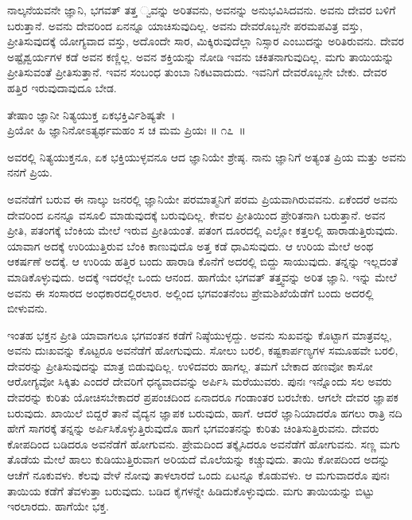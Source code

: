 ನಾಲ್ಕನೆಯವನೇ ಜ್ಞಾನಿ, ಭಗವತ್ ತತ್ತ ್ವವನ್ನು ಅರಿತವನು, ಅವನನ್ನು ಅನುಭವಿಸಿದವನು. ಅವನು ದೇವರ ಬಳಿಗೆ ಬರುತ್ತಾನೆ. ಅವನು ದೇವರಿಂದ ಏನನ್ನೂ ಯಾಚಿಸುವುದಿಲ್ಲ. ಅವನು ದೇವರೊಬ್ಬನೇ ಪರಮಪವಿತ್ರ ವಸ್ತು, ಪ್ರೀತಿಸುವುದಕ್ಕೆ ಯೋಗ್ಯವಾದ ವಸ್ತು, ಅದೊಂದೇ ಸಾರ, ಮಿಕ್ಕಿರುವುದೆಲ್ಲಾ ನಿಸ್ಸಾರ ಎಂಬುದನ್ನು ಅರಿತಿರುವನು. ದೇವರ ಅಷ್ಟೈಶ್ವರ್ಯಗಳ ಕಡೆ ಅವನ ಕಣ್ಣಿಲ್ಲ. ಅವನ ಶಕ್ತಿಯನ್ನು ನೋಡಿ ಇವನು ಚಕಿತನಾಗುವುದಿಲ್ಲ. ಮಗು ತಾಯಿಯನ್ನು ಪ್ರೀತಿಸುವಂತೆ ಪ್ರೀತಿಸುತ್ತಾನೆ. ಇವನ ಸಂಬಂಧ ತುಂಬಾ ನಿಕಟವಾದುದು. ಇವನಿಗೆ ದೇವರೊಬ್ಬನೇ ಬೇಕು. ದೇವರ ಹತ್ತಿರ ಇರುವುದಾವುದೂ ಬೇಡ.

\begin{shloka}
ತೇಷಾಂ ಜ್ಞಾನೀ ನಿತ್ಯಯುಕ್ತ ಏಕಭಕ್ತಿರ್ವಿಶಿಷ್ಯತೇ~।\\ಪ್ರಿಯೋ ಹಿ ಜ್ಞಾನಿನೋಽತ್ಯರ್ಥಮಹಂ ಸ ಚ ಮಮ ಪ್ರಿಯಃ \hfill॥ ೧೭~॥
\end{shloka}

\begin{artha}
ಅವರಲ್ಲಿ ನಿತ್ಯಯುಕ್ತನೂ, ಏಕ ಭಕ್ತಿಯುಳ್ಳವನೂ ಆದ ಜ್ಞಾನಿಯೇ ಶ್ರೇಷ್ಠ. ನಾನು ಜ್ಞಾನಿಗೆ ಅತ್ಯಂತ ಪ್ರಿಯ ಮತ್ತು ಅವನು ನನಗೆ ಪ್ರಿಯ.
\end{artha}

ಅವನೆಡೆಗೆ ಬರುವ ಈ ನಾಲ್ಕು ಜನರಲ್ಲಿ ಜ್ಞಾನಿಯೇ ಪರಮಾತ್ಮನಿಗೆ ಪರಮ ಪ್ರಿಯವಾಗಿರು\-ವವನು. ಏಕೆಂದರೆ ಅವನು ದೇವರಿಂದ ಏನನ್ನೂ ವಸೂಲಿ ಮಾಡುವುದಕ್ಕೆ ಬರುವುದಿಲ್ಲ. ಕೇವಲ ಪ್ರೀತಿಯಿಂದ ಪ್ರೇರಿತನಾಗಿ ಬರುತ್ತಾನೆ. ಅವನ ಪ್ರೀತಿ, ಪತಂಗಕ್ಕೆ ಬೆಂಕಿಯ ಮೇಲೆ ಇರುವ ಪ್ರೀತಿಯಂತೆ. ಪತಂಗ ದೂರದಲ್ಲಿ ಎಲ್ಲೋ ಕತ್ತಲಲ್ಲಿ ಹಾರಾಡುತ್ತಿರುವುದು. ಯಾವಾಗ ಅದಕ್ಕೆ ಉರಿಯುತ್ತಿರುವ ಬೆಂಕಿ ಕಾಣುವುದೊ ಅತ್ತ ಕಡೆ ಧಾವಿಸುವುದು. ಆ ಉರಿಯ ಮೇಲೆ ಅಂಥ ಆಕರ್ಷಣೆ ಅದಕ್ಕೆ. ಆ ಉರಿಯ ಹತ್ತಿರ ಬಂದು ಹಾರಾಡಿ ಕೊನೆಗೆ ಅದರಲ್ಲಿ ಬಿದ್ದು ಸಾಯುವುದು. ತನ್ನನ್ನು ಇಲ್ಲದಂತೆ ಮಾಡಿಕೊಳ್ಳುವುದು. ಅದಕ್ಕೆ ಇದರಲ್ಲೇ ಒಂದು ಆನಂದ. ಹಾಗೆಯೇ ಭಗವತ್ ತತ್ತ್ವವನ್ನು ಅರಿತ ಜ್ಞಾನಿ. ಇನ್ನು ಮೇಲೆ ಅವನು ಈ ಸಂಸಾರದ ಅಂಧಕಾರದಲ್ಲಿರಲಾರ. ಅಲ್ಲಿಂದ ಭಗವಂತನೆಂಬ ಪ್ರೇಮಶಿಖೆಯೆಡೆಗೆ ಬಂದು ಅದರಲ್ಲಿ ಬೀಳುವನು.

ಇಂತಹ ಭಕ್ತನ ಪ್ರೀತಿ ಯಾವಾಗಲೂ ಭಗವಂತನ ಕಡೆಗೆ ನಿಷ್ಠೆಯುಳ್ಳದ್ದು. ಅವನು ಸುಖವನ್ನು ಕೊಟ್ಟಾಗ ಮಾತ್ರವಲ್ಲ, ಅವನು ದುಃಖವನ್ನು ಕೊಟ್ಟರೂ ಅವನೆಡೆಗೆ ಹೋಗುವುದು. ಸೋಲು ಬರಲಿ, ಕಷ್ಟಕಾರ್ಪಣ್ಯಗಳ ಸಮೂಹವೇ ಬರಲಿ, ದೇವರನ್ನು ಪ್ರೀತಿಸುವುದನ್ನು ಮಾತ್ರ ಬಿಡುವುದಿಲ್ಲ. ಉಳಿದವರು ಹಾಗಲ್ಲ. ತಮಗೆ ಬೇಕಾದ ಹಣವೋ ಕಾಸೋ ಆರೋಗ್ಯವೋ ಸಿಕ್ಕಿತು ಎಂದರೆ ದೇವರಿಗೆ ಧನ್ಯವಾದವನ್ನು ಅರ್ಪಿಸಿ ಮರೆಯುವರು. ಪುನಃ ಇನ್ನೊಂದು ಸಲ ಅವರು ದೇವರನ್ನು ಕುರಿತು ಯೋಚಿಸಬೇಕಾದರೆ ಪ್ರಪಂಚದಿಂದ ಏನಾದರೂ ಗಂಡಾಂತರ ಬರಬೇಕು. ಆಗಲೇ ದೇವರ ಜ್ಞಾಪಕ ಬರುವುದು. ಖಾಯಿಲೆ ಬಿದ್ದರೆ ತಾನೆ ವೈದ್ಯನ ಜ್ಞಾಪಕ ಬರುವುದು, ಹಾಗೆ. ಆದರೆ ಜ್ಞಾನಿಯಾದರೊ ಹಗಲು ರಾತ್ರಿ ನದಿ ಹೇಗೆ ಸಾಗರಕ್ಕೆ ತನ್ನನ್ನು ಅರ್ಪಿಸಿಕೊಳ್ಳುತ್ತಿರುವುದೊ ಹಾಗೆ ಭಗವಂತನನ್ನು ಕುರಿತು ಚಿಂತಿಸುತ್ತಿರುವನು. ದೇವರು ಕೋಪದಿಂದ ಬಡಿದರೂ ಅವನೆಡೆಗೆ ಹೋಗುವನು. ಪ್ರೇಮದಿಂದ ತಕ್ಕೈಸಿದರೂ ಅವನೆಡೆಗೆ ಹೋಗುವನು. ಸಣ್ಣ ಮಗು ತೊಡೆಯ ಮೇಲೆ ಹಾಲು ಕುಡಿಯುತ್ತಿರುವಾಗ ಅರಿಯದೆ ಮೊಲೆಯನ್ನು ಕಚ್ಚುವುದು. ತಾಯಿ ಕೋಪದಿಂದ ಅದನ್ನು ಆಚೆಗೆ ನೂಕುವಳು. ಕೆಲವು ವೇಳೆ ನೋವು ತಾಳಲಾರದೆ ಒಂದು ಏಟನ್ನೂ ಕೊಡುವಳು. ಆ ಮಗುವಾದರೊ ಪುನಃ ತಾಯಿಯ ಕಡೆಗೆ ತೆವಳುತ್ತಾ ಬರುವುದು. ಬಡಿದ ಕೈಗಳನ್ನೇ ಹಿಡಿದುಕೊಳ್ಳುವುದು. ಮಗು ತಾಯಿಯನ್ನು ಬಿಟ್ಟು ಇರಲಾರದು. ಹಾಗೆಯೇ ಭಕ್ತ.

